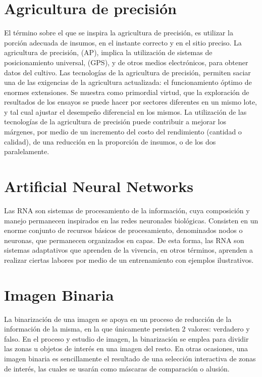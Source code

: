 	\section{Agricultura de precisión} El término sobre el que se inspira la agricultura de precisión, es utilizar la porción adecuada de insumos, en el instante correcto y en el sitio preciso. La agricultura de precisión, (AP), implica la utilización de sistemas de posicionamiento universal, (GPS), y de otros medios electrónicos, para obtener datos del cultivo. Las tecnologías de la agricultura de precisión, permiten saciar una de las exigencias de la agricultura actualizada: el funcionamiento óptimo de enormes extensiones. Se muestra como primordial virtud, que la exploración de resultados de los ensayos se puede hacer por sectores diferentes en un mismo lote, y tal cual ajustar el desempeño diferencial en los mismos. La utilización de las tecnologías de la agricultura de precisión puede contribuir a mejorar los márgenes, por medio de un incremento del costo del rendimiento (cantidad o calidad), de una reducción en la proporción de insumos, o de los dos paralelamente.
	\\
	\section{Artificial Neural Networks} Las RNA son sistemas de procesamiento de la información, cuya composición y manejo permanecen inspirados en las redes neuronales biológicas. Consisten en un enorme conjunto de recursos básicos de procesamiento, denominados nodos o neuronas, que permanecen organizados en capas. De esta forma, las RNA son sistemas adaptativos que aprenden de la vivencia, en otros términos, aprenden a realizar ciertas labores por medio de un entrenamiento con ejemplos ilustrativos.
	\\ 
	
	\section{Imagen Binaria} La binarización de una imagen se apoya en un proceso de reducción de la información de la misma, en la que únicamente persisten 2 valores: verdadero y falso. En el proceso y estudio de imagen, la binarización se emplea para dividir las zonas u objetos de interés en una imagen del resto. En otras ocasiones, una imagen binaria es sencillamente el resultado de una selección interactiva de zonas de interés, las cuales se usarán como máscaras de comparación o alusión.
	\\ 
	
